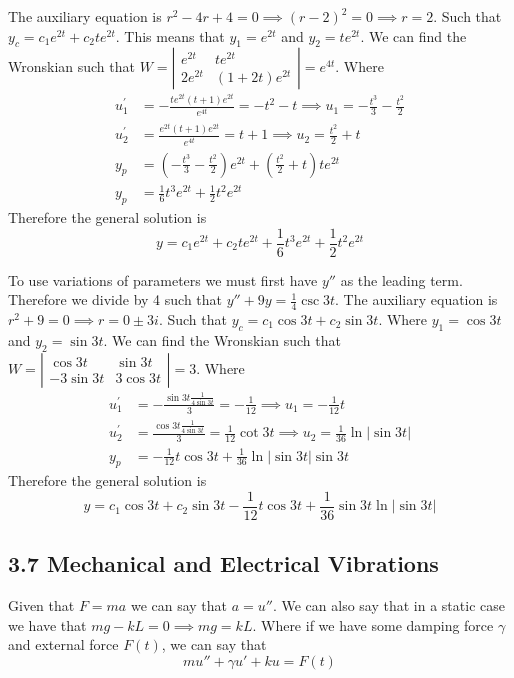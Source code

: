 \documentclass{article}
\begin{document}
\sol The auxiliary equation is $r^2 - 4r + 4 = 0 \implies (r-2)^2 = 0 \implies r = 2$.
Such that $y_c = c_1 e^{2t} + c_2 t e^{2t}$. This means that $y_1 = e^{2t}$ and $y_2 = t e^{2t}$.
\double
We can find the Wronskian such that $W = \left| \begin{array}{cc} e^{2t} & t e^{2t} \\ 2e^{2t} & (1+2t)e^{2t} \end{array} \right| = e^{4t}$.
\double
Where 
\begin{align*}
u_1^{\prime} &= -\frac{te^{2t}(t+1)e^{2t}}{e^{4t}} = -t^2-t \implies u_1 = -\frac{t^3}{3} - \frac{t^2}{2} \\
u_2^{\prime} &= \frac{e^{2t}(t+1)e^{2t}}{e^{4t}} = t+1 \implies u_2 = \frac{t^2}{2} + t \\
y_p &= \left(-\frac{t^3}{3} - \frac{t^2}{2}\right) e^{2t} + \left(\frac{t^2}{2} + t\right) t e^{2t} \\
y_p &= \frac{1}{6}t^3 e^{2t} + \frac{1}{2}t^2 e^{2t}
\end{align*}
Therefore the general solution is
$$\boxed{y = c_1 e^{2t} + c_2 t e^{2t} + \frac{1}{6}t^3 e^{2t} + \frac{1}{2}t^2 e^{2t}}$$

\sol To use variations of parameters we must first have $y''$ as the leading term. Therefore we divide by 4 such that $y'' + 9y = \frac{1}{4} \csc 3t$.
\double
The auxiliary equation is $r^2 + 9 = 0 \implies r = 0 \pm 3i$. Such that $y_c = c_1 \cos 3t + c_2 \sin 3t$.
Where $y_1 = \cos 3t$ and $y_2 = \sin 3t$.
\double
We can find the Wronskian such that $W = \left| \begin{array}{cc} \cos 3t & \sin 3t \\ -3\sin 3t & 3\cos 3t \end{array} \right| = 3$.
\double
Where
\begin{align*}
u_1^{\prime} &= -\frac{\sin 3t \frac{1}{4 \sin 3t}}{3} = -\frac{1}{12} \implies u_1 = -\frac{1}{12} t \\
u_2^{\prime} &= \frac{\cos 3t \frac{1}{4\sin 3t}}{3} = \frac{1}{12} \cot 3t \implies u_2 = \frac{1}{36} \ln |\sin 3t| \\
y_p &= -\frac{1}{12} t \cos 3t + \frac{1}{36} \ln |\sin 3t| \sin 3t
\end{align*}
Therefore the general solution is
$$\boxed{y = c_1 \cos 3t + c_2 \sin 3t -\frac{1}{12} t \cos 3t + \frac{1}{36} \sin 3t \ln |\sin 3t|}$$

\subsection*{3.7 Mechanical and Electrical Vibrations}
Given that $F=ma$ we can say that $a = u''$. We can also say that in a static case we have that $mg - kL = 0 \implies mg = kL$.
Where if we have some damping force $\gamma$ and external force $F(t)$, we can say that
$$ m u'' + \gamma u' + ku = F(t) $$
\end{document}
